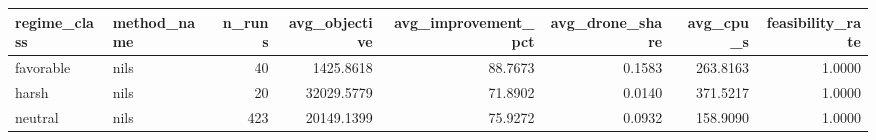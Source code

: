 \begin{tabular}{llrrrrrr}
\toprule
regime_class & method_name & n_runs & avg_objective & avg_improvement_pct & avg_drone_share & avg_cpu_s & feasibility_rate \\
\midrule
favorable & nils & 40 & 1425.8618 & 88.7673 & 0.1583 & 263.8163 & 1.0000 \\
harsh & nils & 20 & 32029.5779 & 71.8902 & 0.0140 & 371.5217 & 1.0000 \\
neutral & nils & 423 & 20149.1399 & 75.9272 & 0.0932 & 158.9090 & 1.0000 \\
\bottomrule
\end{tabular}
